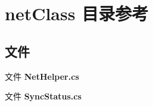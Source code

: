 \section{net\+Class 目录参考}
\label{dir_66f6e68957d2eb98b24dae01359462ff}
\subsection*{文件}
\begin{DoxyCompactItemize}
\item 
文件 \textbf{ Net\+Helper.\+cs}
\item 
文件 \textbf{ Sync\+Status.\+cs}
\end{DoxyCompactItemize}
